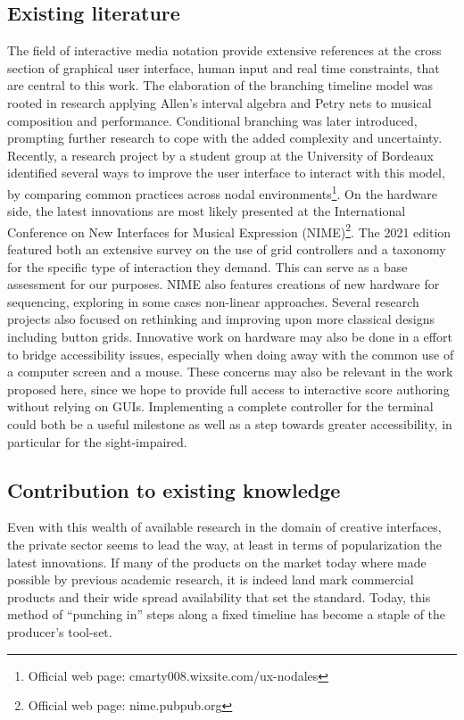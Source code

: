 \documentclass[journal,onecolumn]{IEEEtran}
\begin{document}

\subsection{Existing literature}
The field of interactive media notation\cite{ircam:antescofo}\cite{buzzing:iannix}\cite{grame:inscore} provide extensive references at the cross section of graphical user interface, human input and real time constraints, that are central to this work. 
The elaboration of the branching timeline model was rooted in research applying Allen's interval algebra\cite{allombert:constraint} and Petry nets\cite{allombert:petri} to musical composition and performance. Conditional branching was later introduced\cite{toro:condition}, prompting further research to cope with the added complexity and uncertainty\cite{arias:colour}. Recently, a research project by a student group at the University of Bordeaux identified several ways to improve the user interface to interact with this model, by comparing common practices across nodal environments\footnote{Official web page: cmarty008.wixsite.com/ux-nodales}. On the hardware side, the latest innovations are most likely presented at the International Conference on New Interfaces for Musical Expression (NIME)\footnote{Official web page: nime.pubpub.org}. The 2021 edition featured both an extensive survey on the use of grid controllers\cite{rossmy:grid} and a taxonomy for the specific type of interaction they demand\cite{pust:taxonomy}. This can serve as a base assessment for our purposes. 
NIME also features creations of new hardware for sequencing\cite{arellano:radear}, exploring in some cases non-linear approaches\cite{hayes:neurohedron}. Several research projects also focused on rethinking and improving upon more classical designs\cite{snyder:jd} including button grids\cite{rossmy:touch}. Innovative work on hardware may also be done in a effort to bridge accessibility issues\cite{forester:loopblocks}, especially when doing away with the common use of a computer screen and a mouse. These concerns may also be relevant in the work proposed here, since we hope to provide full access to interactive score authoring without relying on GUIs. Implementing a complete controller for the terminal could both be a useful milestone as well as a step towards greater accessibility, in particular for the sight-impaired. 

\subsection{Contribution to existing knowledge}
Even with this wealth of available research in the domain of creative interfaces, the private sector seems to lead the way, at least in terms of popularization the latest innovations. If many of the products on the market today where made possible by previous academic research, it is indeed land mark commercial products and their wide spread availability that set the standard. Today, this method of ``punching in'' steps along a fixed timeline has become a staple of the producer's tool-set.
\end{document}
